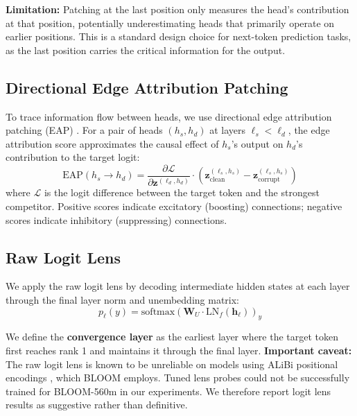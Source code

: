 \documentclass[11pt]{article}
\begin{document}
\textbf{Limitation:} Patching at the last position only measures the head's contribution at that position, potentially underestimating heads that primarily operate on earlier positions.
This is a standard design choice for next-token prediction tasks, as the last position carries the critical information for the output.

\subsection{Directional Edge Attribution Patching}
\label{sec:method:eap}

To trace information flow between heads, we use directional edge attribution patching (EAP) \cite{nanda2023attribution, syed2024attribution}.
For a pair of heads $(h_s, h_d)$ at layers $\ell_s < \ell_d$, the edge attribution score approximates the causal effect of $h_s$'s output on $h_d$'s contribution to the target logit:
\begin{equation}
\text{EAP}(h_s \to h_d) = \frac{\partial \mathcal{L}}{\partial \mathbf{z}^{(\ell_d, h_d)}} \cdot \left(\mathbf{z}_{\text{clean}}^{(\ell_s, h_s)} - \mathbf{z}_{\text{corrupt}}^{(\ell_s, h_s)}\right)
\label{eq:eap}
\end{equation}
where $\mathcal{L}$ is the logit difference between the target token and the strongest competitor.
Positive scores indicate excitatory (boosting) connections; negative scores indicate inhibitory (suppressing) connections.

\subsection{Raw Logit Lens}
\label{sec:method:logitlens}

We apply the raw logit lens \cite{nostalgebraist2020logitlens} by decoding intermediate hidden states at each layer through the final layer norm and unembedding matrix:
\begin{equation}
p_\ell(y) = \text{softmax}\left(\mathbf{W}_U \cdot \text{LN}_f(\mathbf{h}_\ell)\right)_y
\end{equation}

We define the \textbf{convergence layer} as the earliest layer where the target token first reaches rank 1 and maintains it through the final layer.
\textbf{Important caveat:} The raw logit lens is known to be unreliable on models using ALiBi positional encodings \cite{belrose2023tuned}, which BLOOM employs.
Tuned lens probes could not be successfully trained for BLOOM-560m in our experiments.
We therefore report logit lens results as suggestive rather than definitive.
\end{document}
